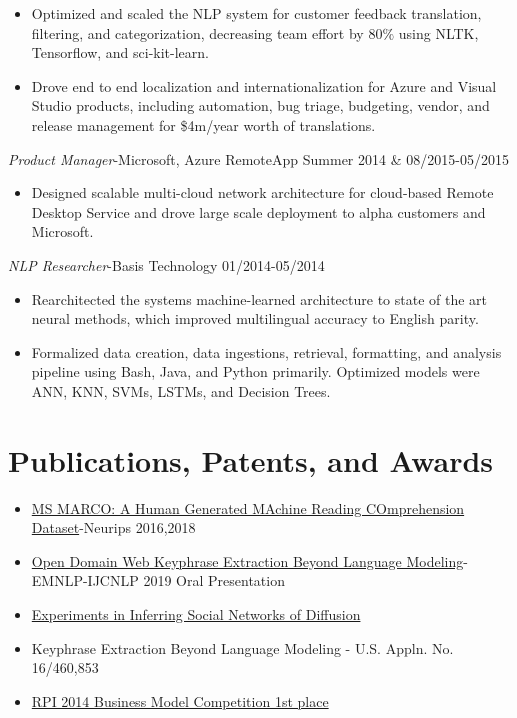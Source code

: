 \documentclass[line,margin]{res}
\begin{document}
\begin{resume}
\begin{itemize}
\item Optimized and scaled the NLP system for customer feedback translation, filtering, and categorization, decreasing team effort by $80\%$ using NLTK, Tensorflow, and sci-kit-learn.
\item Drove end to end localization and internationalization for Azure and Visual Studio products, including automation, bug triage, budgeting, vendor, and release management for \$4m/year worth of translations.
\end{itemize}
{\sl Product Manager}-Microsoft, Azure RemoteApp  \hfill Summer 2014 \& 08/2015-05/2015
\begin{itemize}  \itemsep -4pt
\item Designed scalable multi-cloud network architecture for cloud-based Remote Desktop Service and drove large scale deployment to alpha customers and Microsoft.
\end{itemize}
{\sl NLP Researcher}-Basis Technology \hfill 01/2014-05/2014
\begin{itemize}  \itemsep -4pt
\item Rearchitected the systems machine-learned architecture to state of the art neural methods, which improved multilingual accuracy to English parity.
\item Formalized data creation, data ingestions, retrieval, formatting, and analysis pipeline using Bash, Java, and Python primarily. Optimized models were ANN, KNN, SVMs, LSTMs, and Decision Trees.
\end{itemize}
\section{Publications, Patents, and Awards}
\begin{itemize}
\itemsep -5pt
\item \href{https://arxiv.org/pdf/1611.09268.pdf}{MS MARCO: A Human Generated MAchine Reading COmprehension Dataset}-Neurips 2016,2018
\item \href{https://www.emnlp-ijcnlp2019.org/program/accepted/f}{Open Domain Web Keyphrase Extraction Beyond Language Modeling}-EMNLP-IJCNLP 2019 Oral Presentation
\item \href{https://arxiv.org/pdf/}{Experiments in Inferring Social Networks of Diffusion}
\item Keyphrase Extraction Beyond Language Modeling - U.S. Appln. No. 16/460,853
\item \href{https://everydaymatters.rpi.edu/business-model-competition/#.XhOXH0f0lyw}{RPI 2014 Business Model Competition 1st place}
\end{itemize}
\end{resume}
\end{document}

